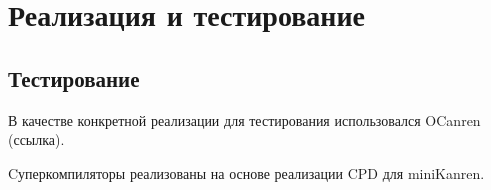 \section{Реализация и тестирование}

\subsection{Тестирование}

В качестве конкретной реализации \ukanren для тестирования
использовался OCanren (ссылка).

Cуперкомпиляторы реализованы на основе реализации CPD для miniKanren.
